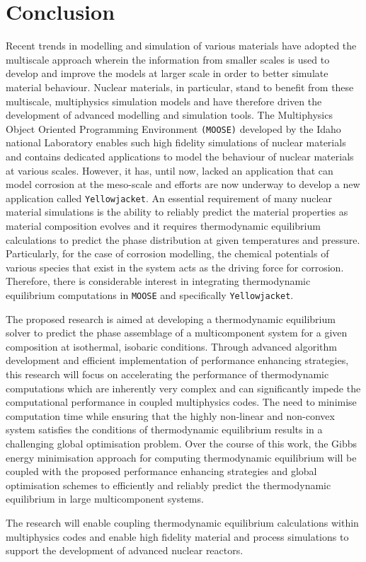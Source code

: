 \chapter{Conclusion}
\label{conclusion}

	Recent trends in modelling and simulation of various materials have adopted the multiscale approach wherein the information from smaller scales is used to develop and improve the models at larger scale in order to better simulate material behaviour. Nuclear materials, in particular, stand to benefit from these multiscale, multiphysics simulation models and have therefore driven the development of advanced modelling and simulation tools. The Multiphysics Object Oriented Programming Environment \texttt{(MOOSE)} developed by the Idaho national Laboratory enables such high fidelity simulations of nuclear materials and contains dedicated applications to model the behaviour of nuclear materials at various scales. However, it has, until now, lacked an application that can model corrosion at the meso-scale and efforts are now underway to develop a new application called \texttt{Yellowjacket}. An essential requirement of many nuclear material simulations is the ability to reliably predict the material properties as material composition evolves and it requires thermodynamic equilibrium calculations to predict the phase distribution at given temperatures and pressure. Particularly, for the case of corrosion modelling, the chemical potentials of various species that exist in the system acts as the driving force for corrosion. Therefore, there is considerable interest in integrating thermodynamic equilibrium computations in \texttt{MOOSE} and specifically \texttt{Yellowjacket}.
	
	The proposed research is aimed at developing a thermodynamic equilibrium solver to predict the phase assemblage of a multicomponent system for a given composition at isothermal, isobaric conditions. Through advanced algorithm development and efficient implementation of performance enhancing strategies, this research will focus on accelerating the performance of thermodynamic computations which are inherently very complex and can significantly impede the computational performance in coupled multiphysics codes. The need to minimise computation time while ensuring that the highly non-linear and non-convex system satisfies the conditions of thermodynamic equilibrium results in a challenging global optimisation problem. Over the course of this work, the Gibbs energy minimisation approach for computing thermodynamic equilibrium will be coupled with the proposed performance enhancing strategies and global optimisation schemes to efficiently and reliably predict the thermodynamic  equilibrium in large multicomponent systems. 
	
	The research will enable coupling thermodynamic equilibrium calculations within multiphysics codes and enable high fidelity material and process simulations to support the development of advanced nuclear reactors.
	
	
	
	